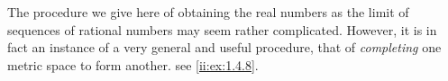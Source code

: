 \begin{note}
  The procedure we give here of obtaining the real numbers as the limit of sequences of rational numbers may seem rather complicated.
  However, it is in fact an instance of a very general and useful procedure, that of \emph{completing} one metric space to form another.
  see \cref{ii:ex:1.4.8}.
\end{note}







